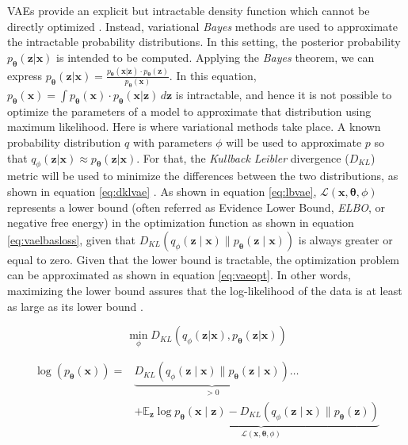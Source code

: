 VAEs provide an explicit but intractable density function which cannot be directly optimized \autocite{Goodfellow2016}. Instead, variational \textit{Bayes} methods are used to approximate the intractable probability distributions. In this setting, the posterior probability $p_\mathbf{\theta}(\mathbf{z}|\mathbf{x})$ is intended to be computed. Applying the \textit{Bayes} theorem, we can express $p_\mathbf{\theta}(\mathbf{z}|\mathbf{x}) = \frac{p_\mathbf{\theta}(\mathbf{x}|\mathbf{z}) \cdot p_\mathbf{\theta}(\mathbf{z})}{p_\mathbf{\theta}(\mathbf{x})}$. In this equation, $p_\mathbf{\theta}(\mathbf{x}) = \int{p_\mathbf{\theta}(\mathbf{x}) \cdot p_\mathbf{\theta}(\mathbf{x}|\mathbf{z})} \,d\mathbf{z}$ is intractable, and hence it is not possible to optimize the parameters of a model to approximate that distribution using maximum likelihood. Here is where variational methods take place. A known probability distribution $q$ with parameters $\phi$ will be used to approximate $p$ so that $q_\phi(\mathbf{z}|\mathbf{x}) \approx p_\mathbf{\theta}(\mathbf{z}|\mathbf{x})$. For that, the \textit{Kullback Leibler} divergence ($D_{KL}$) metric will be used to minimize the differences between the two distributions, as shown in equation \ref{eq:dklvae} \autocite{kingma2019}. As shown in equation \ref{eq:lbvae}, $\mathcal{L}(\mathbf{x}, \mathbf{\theta}, \phi)$ represents a lower bound (often referred as Evidence Lower Bound, \textit{ELBO}, or negative free energy) in the optimization function as shown in equation \ref{eq:vaelbasloss}, given that $D_{K L}\left(q_{\phi}(\mathbf{z} \mid \mathbf{x}) \| p_{\mathbf{\theta}}(\mathbf{z} \mid \mathbf{x})\right)$ is always greater or equal to zero. Given that the lower bound is tractable, the optimization problem can be approximated as shown in equation \ref{eq:vaeopt}. In other words, maximizing the lower bound assures that the log-likelihood of the data is at least as large as its lower bound \autocite{wei2021}.

\begin{equation}
\label{eq:dklvae}
\min_{\phi} D_{KL}\left(q_\phi(\mathbf{z}|\mathbf{x}), p_\mathbf{\theta}(\mathbf{z}|\mathbf{x})\right)
\end{equation}

\begin{equation}
\label{eq:lbvae}
\begin{aligned}
\log \left(p_{\mathbf{\theta}}(\mathbf{x})\right) =& \underbrace{D_{K L}\left(q_{\phi}(\mathbf{z} \mid \mathbf{x}) \| p_{\mathbf{\theta}}(\mathbf{z} \mid \mathbf{x})\right)}_{>0} \ldots \\
&+\underbrace{\mathbb{E}_{\mathbf{z}} \log p_{\mathbf{\theta}}(\mathbf{x} \mid \mathbf{z})-D_{K L}\left(q_{\phi}(\mathbf{z} \mid \mathbf{x}) \| p_{\mathbf{\theta}}(\mathbf{z})\right)}_{\mathcal{L}(\mathbf{x}, \mathbf{\theta}, \phi)}
\end{aligned}
\end{equation}

